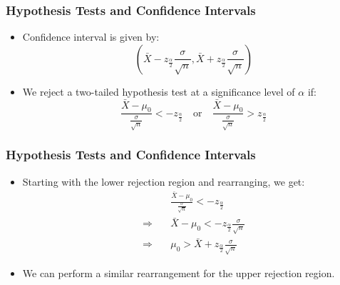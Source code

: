 \documentclass[14pt]{beamer}
\begin{document}
\begin{frame}
	\frametitle{Hypothesis Tests and Confidence Intervals}
	
	\begin{itemize}[label={\color{blue}$\blacktriangleright$}]
		\item Confidence interval is given by:
		\[
		\left(\bar{X} - z_{\frac{\alpha}{2}}\frac{\sigma}{\sqrt{n}}, \bar{X} + z_{\frac{\alpha}{2}}\frac{\sigma}{\sqrt{n}}\right)
		\]
		
		\item We reject a two-tailed hypothesis test at a significance level of $\alpha$ if:
		\[
		\frac{\bar{X} - \mu_0}{\frac{\sigma}{\sqrt{n}}} < -z_{\frac{\alpha}{2}} \quad \text{or} \quad \frac{\bar{X} - \mu_0}{\frac{\sigma}{\sqrt{n}}} > z_{\frac{\alpha}{2}}
		\]
	\end{itemize}
	
\end{frame}
\begin{frame}
	\frametitle{Hypothesis Tests and Confidence Intervals}
	
	\begin{itemize}[label={\color{blue}$\blacktriangleright$}]
		\item Starting with the lower rejection region and rearranging, we get:
		\[
		\begin{aligned}
			&\frac{\bar{X} - \mu_0}{\frac{\sigma}{\sqrt{n}}} < -z_{\frac{\alpha}{2}} \\[1ex]
			\Rightarrow \quad &\bar{X} - \mu_0 < -z_{\frac{\alpha}{2}}\frac{\sigma}{\sqrt{n}} \\[1ex]
			\Rightarrow \quad &\mu_0 > \bar{X} + z_{\frac{\alpha}{2}}\frac{\sigma}{\sqrt{n}}
		\end{aligned}
		\]
		
		\item We can perform a similar rearrangement for the upper rejection region.
	\end{itemize}
	
\end{frame}
\end{document}
